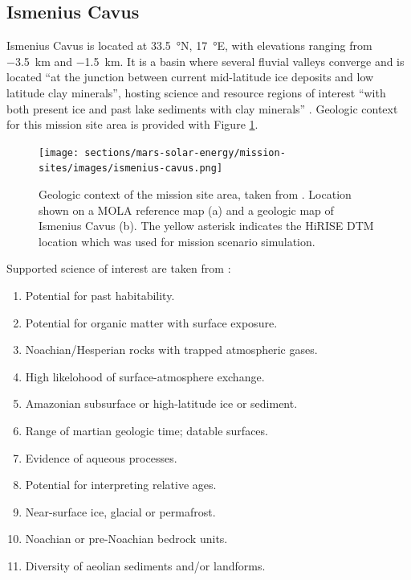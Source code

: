 \subsection{Ismenius Cavus}
\label{sec:MissionSites:IsmeniusCavus}
Ismenius Cavus is located at \SI{33.5}{\degree}N, \SI{17}{\degree}E, with elevations ranging from \SI{-3.5}{\kilo\meter} and \SI{-1.5}{\kilo\meter}. It is a basin where several fluvial valleys converge and is located ``at the junction between current mid-latitude ice deposits and low latitude clay minerals'', hosting science and resource regions of interest ``with both present ice and past lake sediments with clay minerals''  . Geologic context for this mission site area is provided with Figure \ref{fig:mission-site-ismenius-cavus}.

\begin{figure}[h]
  \centering
  \hypersetup{linkcolor=captionTextColor}
  \texttt{[image: sections/mars-solar-energy/mission-sites/images/ismenius-cavus.png]}\\
  \caption[Geologic context for Ismenius Cavus mission site area]
          {Geologic context of the mission site area, taken from . Location shown on a \ac{MOLA} reference map (a) and a geologic map of Ismenius Cavus (b). The yellow asterisk indicates the \ac{HiRISE} \ac{DTM} location which was used for mission scenario simulation.}
  \label{fig:mission-site-ismenius-cavus}
\end{figure}


Supported science of interest are taken from :
\begin{enumerate}[label=\textbf{\textcolor{BulletBlue}{(\alph*)}}]
    \item Potential for past habitability.
    \item Potential for organic matter with surface exposure.
    \item Noachian/Hesperian rocks with trapped atmospheric gases.
    \item High likelohood of surface-atmosphere exchange.
    \item Amazonian subsurface or high-latitude ice or sediment.
    \item Range of martian geologic time; datable surfaces.
    \item Evidence of aqueous processes.
    \item Potential for interpreting relative ages.
    \item Near-surface ice, glacial or permafrost.
    \item Noachian or pre-Noachian bedrock units.
    \item Diversity of aeolian sediments and/or landforms.
\end{enumerate}

